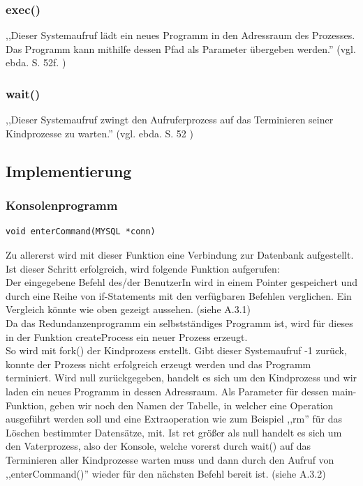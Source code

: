 \documentclass[12pt]{report}
\begin{document}
\subsubsection{exec()}
,,Dieser Systemaufruf lädt ein neues Programm in den Adressraum des Prozesses. Das Programm kann mithilfe dessen Pfad als Parameter übergeben werden.'' (vgl. ebda. S. 52f. \nocite{OS})

\subsubsection{wait()}
,,Dieser Systemaufruf zwingt den Aufruferprozess auf das Terminieren seiner Kindprozesse zu warten.'' (vgl. ebda. S. 52 \nocite{OS})

\subsection{Implementierung}

\subsubsection{Konsolenprogramm}

\begin{lstlisting}
void enterCommand(MYSQL *conn)
\end{lstlisting}

\noindent Zu allererst wird mit dieser Funktion eine Verbindung zur Datenbank aufgestellt. Ist dieser Schritt erfolgreich, wird folgende Funktion aufgerufen:\\

\noindent Der eingegebene Befehl des/der BenutzerIn wird in einem Pointer gespeichert und durch eine Reihe von if-Statements mit den verfügbaren Befehlen verglichen. Ein Vergleich könnte wie oben gezeigt aussehen. (siehe A.3.1)\\

\noindent Da das Redundanzenprogramm ein selbstständiges Programm ist, wird für dieses in der Funktion createProcess ein neuer Prozess erzeugt.\\
So wird mit fork() der Kindprozess erstellt. Gibt dieser Systemaufruf -1 zurück, konnte der Prozess nicht erfolgreich erzeugt werden und das Programm terminiert. Wird null zurückgegeben, handelt es sich um den Kindprozess und wir laden ein neues Programm in dessen Adressraum. Als Parameter für dessen main-Funktion, geben wir noch den Namen der Tabelle, in welcher eine Operation ausgeführt werden soll und eine Extraoperation wie zum Beispiel ,,rm'' für das Löschen bestimmter Datensätze, mit. Ist ret größer als null handelt es sich um den Vaterprozess, also der Konsole, welche vorerst durch wait() auf das Terminieren aller Kindprozesse warten muss und dann durch den Aufruf von ,,enterCommand()'' wieder für den nächsten Befehl bereit ist. (siehe A.3.2)\\
\end{document}
